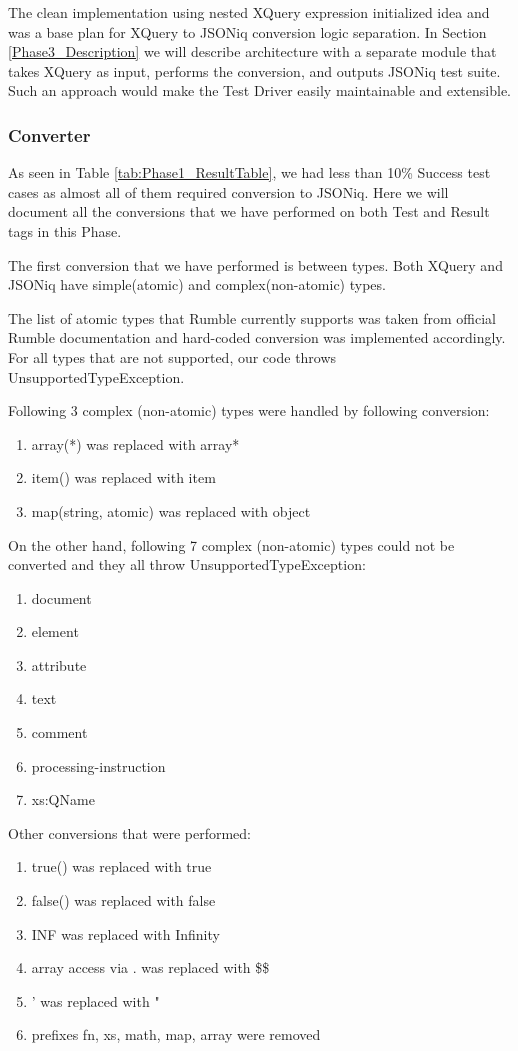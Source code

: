 The clean implementation using nested XQuery expression initialized idea and was a base plan for XQuery to JSONiq conversion logic separation. In Section \ref{Phase3_Description} we will describe architecture with a separate module that takes XQuery as input, performs the conversion, and outputs JSONiq test suite. Such an approach would make the Test Driver easily maintainable and extensible.

\subsubsection{Converter}
\label{Phase2_Converter}
As seen in Table \ref{tab:Phase1_ResultTable}, we had less than 10\% Success test cases as almost all of them required conversion to JSONiq. Here we will document all the conversions that we have performed on both Test and Result tags in this Phase. 

The first conversion that we have performed is between types. Both XQuery and JSONiq have simple(atomic) and complex(non-atomic) types. 

The list of atomic types that Rumble currently supports was taken from official Rumble documentation \cite{RumbleSupportedTypes} and hard-coded conversion was implemented accordingly. For all types that are not supported, our code throws UnsupportedTypeException. 

Following 3 complex (non-atomic) types were handled by following conversion:
\begin{enumerate}
	\item array(*) was replaced with array*
	\item item() was replaced with item
	\item map(string, atomic) was replaced with object 
\end{enumerate}

On the other hand, following 7 complex (non-atomic) types could not be converted and they all throw UnsupportedTypeException:
\begin{enumerate}
	\item document
	\item element
	\item attribute
	\item text
	\item comment
	\item processing-instruction
	\item xs:QName
\end{enumerate}

Other conversions that were performed:
\begin{enumerate}
	\item true() was replaced with true
	\item false() was replaced with false
	\item INF was replaced with Infinity
	\item array access via . was replaced with \$\$
	\item ' was replaced with "
	\item prefixes fn, xs, math, map, array were removed
\end{enumerate}

